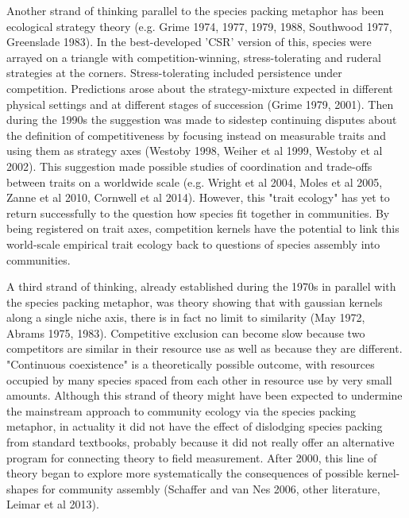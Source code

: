 \documentclass[a4paper,11pt]{article}
\begin{document}
Another strand of thinking parallel to the species packing metaphor has been ecological strategy theory (e.g. Grime 1974, 1977, 1979, 1988, Southwood 1977, Greenslade 1983). In the best-developed 'CSR' version of this, species were arrayed on a triangle with competition-winning, stress-tolerating and ruderal strategies at the corners. Stress-tolerating included persistence under competition. Predictions arose about the strategy-mixture expected in different physical settings and at different stages of succession (Grime 1979, 2001). Then during the 1990s the suggestion was made to sidestep continuing disputes about the definition of competitiveness by focusing instead on measurable traits and using them as strategy axes (Westoby 1998, Weiher et al 1999, Westoby et al 2002). This suggestion made possible studies of coordination and trade-offs between traits on a worldwide scale (e.g. Wright et al 2004, Moles et al 2005, Zanne et al 2010, Cornwell et al 2014). However, this "trait ecology" has yet to return successfully to the question how species fit together in communities. By being registered on trait axes, competition kernels have the potential to link this world-scale empirical trait ecology back to questions of species assembly into communities.

A third strand of thinking, already established during the 1970s in parallel with the species packing metaphor, was theory showing that with gaussian kernels along a single niche axis, there is in fact no limit to similarity (May 1972, Abrams 1975, 1983). Competitive exclusion can become slow because two competitors are similar in their resource use as well as because they are different. "Continuous coexistence" is a theoretically possible outcome, with resources occupied by many species spaced from each other in resource use by very small amounts. Although this strand of theory might have been expected to undermine the mainstream approach to community ecology via the species packing metaphor, in actuality it did not have the effect of dislodging species packing from standard textbooks, probably because it did not really offer an alternative program for connecting theory to field measurement.  After 2000, this line of theory began to explore more systematically the consequences of possible kernel-shapes for community assembly (Schaffer and van Nes 2006, other literature, Leimar et al 2013).
\end{document}
